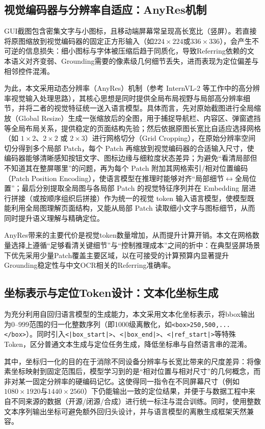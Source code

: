 \subsection{视觉编码器与分辨率自适应：AnyRes机制}
GUI截图包含密集文字与小图标，且移动端屏幕常呈现高长宽比（竖屏）。若直接将原图缩放到视觉编码器的固定正方形输入（如$224\times224$或$336\times336$），会产生不可逆的信息损失：细小图标与字体被压缩后趋于同质化，导致Referring依赖的文本语义对齐变弱、Grounding需要的像素级几何细节丢失，进而表现为定位偏差与相邻控件混淆。

为此，本文采用动态分辨率（AnyRes）机制（参考 InternVL-2 等工作中的高分辨率视觉输入处理思路\citep{openGVLab2024internvl2}），其核心思想是同时提供全局布局视野与局部高分辨率细节，并将二者的视觉特征统一送入语言模型。具体而言，先对原始截图进行全局缩放（Global Resize）生成一张缩放后的全图，用于捕捉导航栏、内容区、弹窗遮挡等全局布局关系，提供稳定的页面结构先验；然后依据原图长宽比自适应选择网格（如 $1\times2$、$2\times2$ 或 $2\times3$）进行网格切分（Grid Cropping），在原始分辨率空间切分得到多个局部 Patch，每个 Patch 再缩放到视觉编码器的合适输入尺寸，使编码器能够清晰感知按钮文字、图标边缘与细粒度状态差异；为避免“看清局部但不知道其在整屏哪里”的问题，再为每个 Patch 附加其网格索引/相对位置编码（Patch Position Encoding），使语言模型在推理时能够对齐“局部细节$\leftrightarrow$全局位置”；最后分别提取全局图与各局部 Patch 的视觉特征序列并在 Embedding 层进行拼接（或按顺序组织后拼接）作为统一的视觉 token 输入语言模型，使模型既能利用全局图理解页面结构，又能从局部 Patch 读取细小文字与图标细节，从而同时提升语义理解与精确定位。

AnyRes带来的主要代价是视觉token数量增加，从而提升计算开销。本文在网格数量选择上遵循“足够看清关键细节”与“控制推理成本”之间的折中：在典型竖屏场景下优先采用少量Patch覆盖主要区域，以在可接受的计算预算内显著提升Grounding稳定性与中文OCR相关的Referring准确率。

\subsection{坐标表示与定位Token设计：文本化坐标生成}
为充分利用自回归语言模型的生成能力，本文采用文本化坐标表示，将bbox输出为$0\text{--}999$范围的归一化整数序列（即1000级离散化，如\texttt{<box>250,500,\allowbreak ...</box>}）。同时引入\texttt{<|box\_start|>}、\texttt{<|box\_end|>}、\texttt{<|ref\_start|>}等特殊Token，区分普通文本生成与定位任务生成，降低坐标串与自然语言串的混淆。

其中，坐标归一化的目的在于消除不同设备分辨率与长宽比带来的尺度差异：将像素坐标映射到固定范围后，模型学习到的是“相对位置与相对尺寸”的几何概念，而非对某一固定分辨率的硬编码记忆。这使得同一指令在不同屏幕尺寸（例如$1080\times1920$与$1440\times2560$）下仍能输出一致的定位结果，并便于与数据工程中来自不同来源的数据（开源/闭源/合成）进行统一标注与混合训练。同时，使用整数文本序列输出坐标可避免额外回归头设计，并与语言模型的离散生成框架天然兼容。

